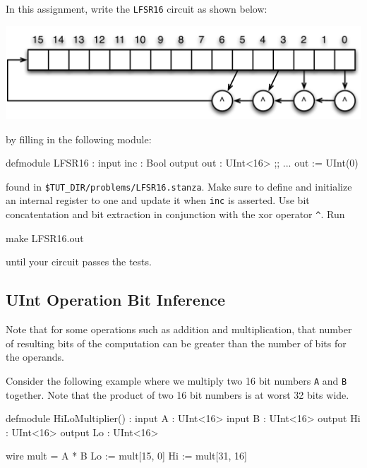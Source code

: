 \subsection{}

In this assignment, write the \verb+LFSR16+ circuit as shown below:

\begin{center}
\includegraphics[width=0.9\columnwidth]{figs/LFSR16.pdf}
\end{center}

\noindent
by filling in the following module:

\begin{stanza}
defmodule LFSR16 :
  input  inc : Bool
  output out : UInt<16>
  ;; ...
  out := UInt(0)
\end{stanza}

\noindent
found in \verb+$TUT_DIR/problems/LFSR16.stanza+.
Make sure to define and initialize an internal register to one and 
update it when \verb+inc+ is asserted.
Use bit concatentation and bit extraction 
in conjunction with the xor operator \verb+^+.  Run 

\begin{bash}
make LFSR16.out
\end{bash}

\noindent 
until your circuit passes the tests.

\subsection{UInt Operation Bit Inference}

Note that for some operations such as addition and multiplication, that number of resulting bits of the computation can be greater than the number of bits for the operands. 

Consider the following example where we multiply two 16 bit numbers \verb+A+ and \verb+B+ together. Note that the product of two 16 bit numbers is at worst 32 bits wide.

\begin{stanza}
defmodule HiLoMultiplier() :
  input A   : UInt<16>
  input B   : UInt<16>
  output Hi : UInt<16>
  output Lo : UInt<16>

  wire mult = A * B
  Lo := mult[15, 0]
  Hi := mult[31, 16]
\end{stanza}


